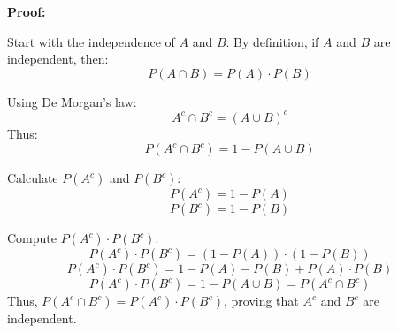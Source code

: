 \documentclass[letter]{article}
\theoremstyle{definition}
\newenvironment{soln}{
	\leavevmode\color{black}\ignorespaces
}{}
\begin{document}
\begin{enumerate}
\begin{soln}
            \textbf{Proof:}
            
            Start with the independence of $A$ and $B$. By definition, if $A$ and $B$ are independent, then:
            \[
            P(A \cap B) = P(A) \cdot P(B)
            \]
            
            Using De Morgan's law:
            \[
            A^c \cap B^c = (A \cup B)^c
            \]
            Thus:
            \[
            P(A^c \cap B^c) = 1 - P(A \cup B)
            \]

            Calculate $P(A^c)$ and $P(B^c)$:
            \[
            P(A^c) = 1 - P(A)
            \]
            \[
            P(B^c) = 1 - P(B)
            \]

            Compute $P(A^c) \cdot P(B^c)$:
            \[
            P(A^c) \cdot P(B^c) = (1 - P(A)) \cdot (1 - P(B))
            \]
            \[
            P(A^c) \cdot P(B^c) = 1 - P(A) - P(B) + P(A) \cdot P(B)
            \]
            \[
            P(A^c) \cdot P(B^c) = 1 - P(A \cup B) = P(A^c \cap B^c)
            \]
            Thus, $P(A^c \cap B^c) = P(A^c) \cdot P(B^c)$, proving that $A^c$ and $B^c$ are independent.
            \end{soln}
		
	\end{enumerate}
	
\end{document}
